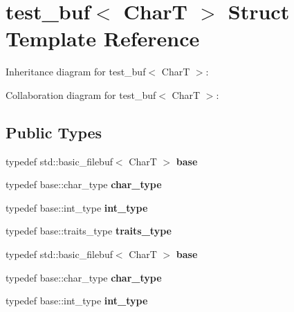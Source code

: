 \hypertarget{structtest__buf}{}\section{test\+\_\+buf$<$ CharT $>$ Struct Template Reference}
\label{structtest__buf}


Inheritance diagram for test\+\_\+buf$<$ CharT $>$\+:


Collaboration diagram for test\+\_\+buf$<$ CharT $>$\+:
\subsection*{Public Types}
\begin{DoxyCompactItemize}
\item 
\mbox{\label{structtest__buf_a8ffc8732def58a5aea9cf554ae2cf5c1}} 
typedef std\+::basic\+\_\+filebuf$<$ CharT $>$ {\bfseries base}
\item 
\mbox{\label{structtest__buf_ad9efd221a65faf6eabbd82c50c72f7f1}} 
typedef base\+::char\+\_\+type {\bfseries char\+\_\+type}
\item 
\mbox{\label{structtest__buf_a824d143321ad5e6d087d55c59a7a9ea6}} 
typedef base\+::int\+\_\+type {\bfseries int\+\_\+type}
\item 
\mbox{\label{structtest__buf_ad2ec103e3e5c69ece4b70dc12c83b1ce}} 
typedef base\+::traits\+\_\+type {\bfseries traits\+\_\+type}
\item 
\mbox{\label{structtest__buf_a8ffc8732def58a5aea9cf554ae2cf5c1}} 
typedef std\+::basic\+\_\+filebuf$<$ CharT $>$ {\bfseries base}
\item 
\mbox{\label{structtest__buf_ad9efd221a65faf6eabbd82c50c72f7f1}} 
typedef base\+::char\+\_\+type {\bfseries char\+\_\+type}
\item 
\mbox{\label{structtest__buf_a824d143321ad5e6d087d55c59a7a9ea6}} 
typedef base\+::int\+\_\+type {\bfseries int\+\_\+type}
\item 
\mbox{\label{structtest__buf_ad2ec103e3e5c69ece4b70dc12c83b1ce}} 

\end{DoxyCompactItemize}
